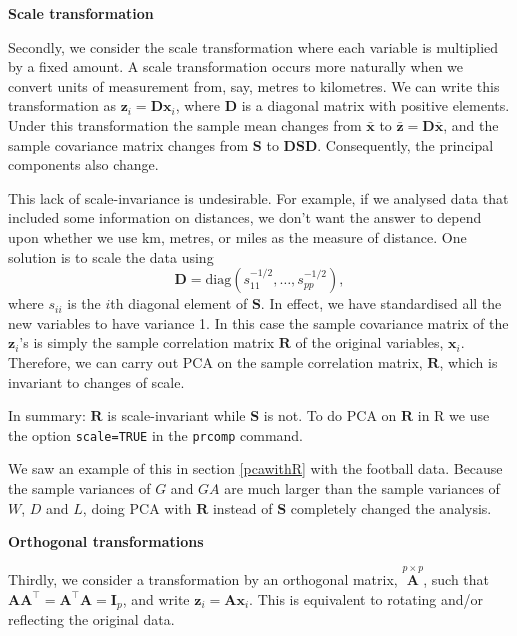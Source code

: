 \documentclass[]{book}
\theoremstyle{definition}
\theoremstyle{definition}
\theoremstyle{definition}
\theoremstyle{remark}
\begin{document}
\textbf{Scale transformation}

Secondly, we consider the scale transformation where each variable is multiplied by a fixed amount.
A scale transformation occurs more naturally when we convert units of measurement from, say, metres to kilometres. We can write this transformation as \(\boldsymbol z_i = \boldsymbol D\boldsymbol x_i\), where \(\boldsymbol D\) is a diagonal matrix with positive elements. Under this transformation the sample mean changes from \(\bar{\boldsymbol x}\) to \(\bar{\boldsymbol z} = \boldsymbol D\bar{\boldsymbol x}\), and the sample covariance matrix changes from \(\boldsymbol S\) to \(\boldsymbol D\boldsymbol S\boldsymbol D\). Consequently, the principal components also change.

This lack of scale-invariance is undesirable. For example, if we analysed data that included some information on distances, we don't want the answer to depend upon whether we use km, metres, or miles as the measure of distance.
One solution is to scale the data using
\[
\boldsymbol D= \text{diag}(s_{11}^{-1/2}, \ldots , s_{pp}^{-1/2}),
 \]
where \(s_{ii}\) is the \(i\)th diagonal element of \(\boldsymbol S\). In effect, we have standardised all the new variables to have variance 1. In this case the sample covariance matrix of the \(\boldsymbol z_i\)'s is simply the sample correlation matrix \(\boldsymbol R\) of the original variables, \(\boldsymbol x_i\). Therefore, we can carry out PCA on the sample correlation matrix, \(\boldsymbol R\), which is invariant to changes of scale.

In summary: \(\boldsymbol R\) is scale-invariant while \(\boldsymbol S\) is not. To do PCA on \(\boldsymbol R\) in R we use the option \texttt{scale=TRUE} in the \texttt{prcomp} command.

We saw an example of this in section \ref{pcawithR} with the football data. Because the sample
variances of \(G\) and \(GA\) are much larger than the sample variances of \(W\), \(D\) and \(L\), doing PCA with \(\boldsymbol R\) instead of \(\boldsymbol S\) completely changed the analysis.

\textbf{Orthogonal transformations}

Thirdly, we consider a transformation by an orthogonal matrix, \(\stackrel{p \times p}{\boldsymbol A}\), such that \(\boldsymbol A\boldsymbol A^\top = \boldsymbol A^\top \boldsymbol A= \mathbf I_p\), and write \(\boldsymbol z_i = \boldsymbol A\boldsymbol x_i\). This is equivalent to rotating and/or reflecting the original data.
\end{document}
